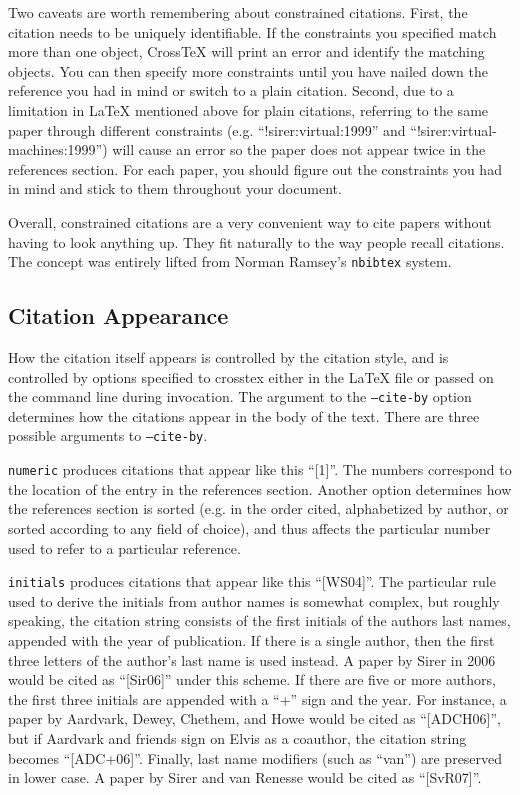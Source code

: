 \documentclass{article}
\newcommand{\XTX}{Cross\TeX}
\begin{document}
Two caveats are worth remembering about constrained citations. First,
the citation needs to be uniquely identifiable. If the constraints you
specified match more than one object, \XTX{} will print an error and
identify the matching objects. You can then specify more constraints until
you have nailed down the reference you had in mind or switch to a plain
citation. Second, due to a limitation in \LaTeX{} mentioned above for plain
citations, referring to the same paper through different constraints
(e.g.  ``!sirer:virtual:1999'' and ``!sirer:virtual-machines:1999'')
will cause an error so the paper does not appear twice in the references
section. For each paper, you should figure out the constraints you had
in mind and stick to them throughout your document.

Overall, constrained citations are a very convenient way to cite papers
without having to look anything up. They fit naturally to the way people
recall citations. The concept was entirely lifted from Norman Ramsey's
\texttt{nbibtex} system.

\subsection{Citation Appearance}

How the citation itself appears is controlled by the citation style,
and is controlled by options specified to crosstex either in the \LaTeX{}
file or passed on the command line during invocation. The argument to the
\texttt{--cite-by} option determines how the citations appear in the body
of the text.  There are three possible arguments to \texttt{--cite-by}.

\texttt{numeric} produces citations that appear like this ``[1]''. The
numbers correspond to the location of the entry in the references
section. Another option determines how the references section is sorted
(e.g. in the order cited, alphabetized by author, or sorted according
to any field of choice), and thus affects the particular number used to
refer to a particular reference.

\texttt{initials} produces citations that appear like this ``[WS04]''. The
particular rule used to derive the initials from author names is
somewhat complex, but roughly speaking, the citation string consists of
the first initials of the authors last names, appended with the year of
publication. If there is a single author, then the first three letters
of the author's last name is used instead. A paper by Sirer in 2006
would be cited as ``[Sir06]'' under this scheme. If there are five
or more authors, the first three initials are appended with a ``+''
sign and the year. For instance, a paper by Aardvark, Dewey, Chethem,
and Howe would be cited as ``[ADCH06]'', but if Aardvark and friends
sign on Elvis as a coauthor, the citation string becomes ``[ADC+06]''.
Finally, last name modifiers (such as ``van'') are preserved in lower
case. A paper by Sirer and van Renesse would be cited as ``[SvR07]''.
\end{document}
